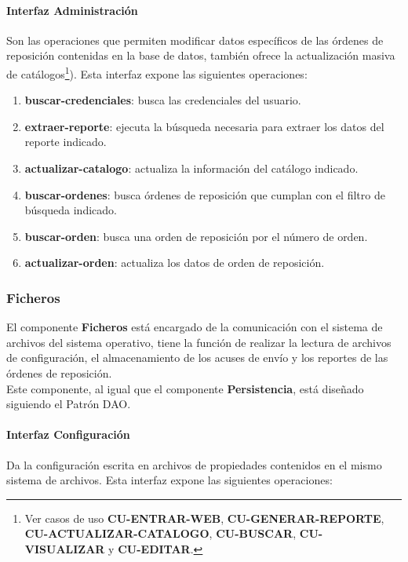 \paragraph{\indent Interfaz Administración\\}
Son las operaciones que permiten modificar datos específicos de las órdenes de reposición contenidas en la base de datos, también ofrece la actualización masiva de catálogos\footnote{Ver casos de uso \textbf{CU-ENTRAR-WEB}, \textbf{CU-GENERAR-REPORTE}, \textbf{CU-ACTUALIZAR-CATALOGO}, \textbf{CU-BUSCAR}, \textbf{CU-VISUALIZAR} y \textbf{CU-EDITAR}.}). Esta interfaz expone las siguientes operaciones:
\begin{enumerate}
	\item \textbf{buscar-credenciales}: busca las credenciales del usuario.
	\item \textbf{extraer-reporte}: ejecuta la búsqueda necesaria para extraer los datos del reporte indicado.
	\item \textbf{actualizar-catalogo}: actualiza la información del catálogo indicado.
	\item \textbf{buscar-ordenes}: busca órdenes de reposición que cumplan con el filtro de búsqueda indicado.
	\item \textbf{buscar-orden}: busca una orden de reposición por el número de orden.
	\item \textbf{actualizar-orden}: actualiza los datos de orden de reposición.
\end{enumerate}

\subsubsection{Ficheros}
El componente \textbf{Ficheros} está encargado de la comunicación con el sistema de archivos del sistema operativo, tiene la función de realizar la lectura de archivos de configuración, el almacenamiento de los acuses de envío y los reportes de las órdenes de reposición.\\
Este componente, al igual que el componente \textbf{Persistencia}, está diseñado siguiendo el Patrón DAO.

\paragraph{\indent Interfaz Configuración\\}
Da la configuración escrita en archivos de propiedades contenidos en el mismo sistema de archivos. Esta interfaz expone las siguientes operaciones:

